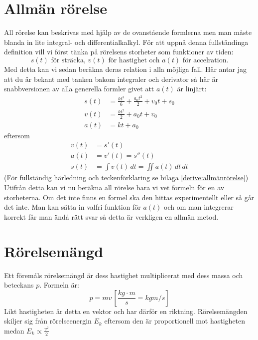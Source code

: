 \section{Allmän rörelse}
All rörelse kan beskrivas med hjälp av de ovanstående formlerna men man måste blanda in lite integral- och differentialkalkyl. För att uppnå denna fullständinga definition vill vi först tänka på rörelsens storheter som funktioner av tiden:
\begin{equation*}
    s(t) \text{ för sträcka, } v(t) \text{ för hastighet och } a(t) \text{ för accelration.}
\end{equation*}
Med detta kan vi sedan beräkna deras relation i alla möjliga fall. Här antar jag att du är bekant med tanken bakom integraler och derivator så här är snabbversionen av alla generella formler givet att $a(t)$ är linjärt:
\begin{align*}
    s(t) &= \frac{kt^3}{6} + \frac{a_0t^2}{2} + v_0t + s_0 \\
    v(t) &= \frac{kt^2}{2} + a_0t + v_0 \\
    a(t) &= kt + a_0
\end{align*}
eftersom
\begin{align*}
    v(t) &= s'(t) \\
    a(t) &= v'(t) = s''(t) \\
    s(t) &= \int{v(t)}\, dt = \iint{a(t)}\, dt\, dt
\end{align*}
(För fullständig härledning och teckenförklaring se bilaga \ref{derive:allmänrörelse}) Utifrån detta kan vi nu beräkna all rörelse bara vi vet formeln för en av storheterna. Om det inte finns en formel ska den hittas experimentellt eller så går det inte. Man kan sätta in valfri funktion för $a(t)$ och om man integrerar korrekt får man ändå rätt svar så detta är verkligen en allmän metod.

\section{Rörelsemängd}
Ett föremåls rörelsemängd är dess hastighet multiplicerat med dess massa och beteckans $p$. Formeln är: \[ p = mv\, \left[\frac{kg \cdot m}{s}  = kgm/s\right] \] Likt hastigheten är detta en vektor och har därför en riktning. Rörelsemängden skiljer sig från rörelseenergin $E_k$ eftersom den är proportionell mot hastigheten medan $E_k \propto \frac{v^2}{2}$